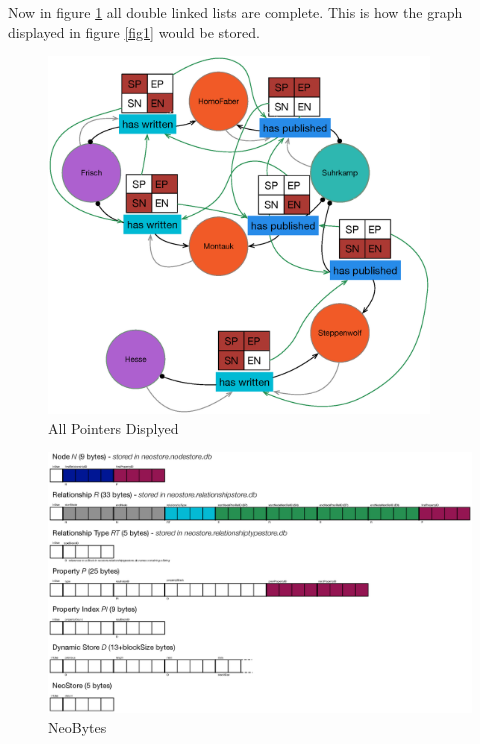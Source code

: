 Now in figure \ref{fig7} all double linked lists are complete. This is how the graph displayed in figure \ref{fig1} would be stored. 

\begin{figure}
	\centering
 	 	\includegraphics[width=0.9\textwidth]{images/complete.eps}
	\caption{All Pointers Displyed}
	\label{fig7}
\end{figure}

\begin{figure}
	\centering
 	 	\includegraphics[width=1.2\textwidth, angle=90]{images/NeoBytes.eps}
	\caption{NeoBytes}
	\label{fig8}
\end{figure}
